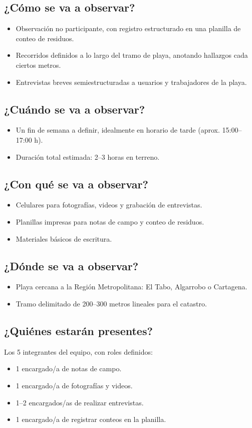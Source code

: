 \documentclass[12pt, letterpaper]{article}
\begin{document}
\subsection*{¿Cómo se va a observar?}
\begin{itemize}
	\item Observación no participante, con registro estructurado
	      en una planilla de conteo de residuos.
	\item Recorridos definidos a lo largo del tramo de playa,
	      anotando hallazgos cada ciertos metros.
	\item Entrevistas breves semiestructuradas a usuarios y
	      trabajadores de la playa.
\end{itemize}

\subsection*{¿Cuándo se va a observar?}
\begin{itemize}
	\item Un fin de semana a definir, idealmente en horario de tarde
	      (aprox. 15:00--17:00 h).
	\item Duración total estimada: 2--3 horas en terreno.
\end{itemize}

\subsection*{¿Con qué se va a observar?}
\begin{itemize}
	\item Celulares para fotografías, videos y grabación de entrevistas.
	\item Planillas impresas para notas de campo y conteo de residuos.
	\item Materiales básicos de escritura.
\end{itemize}

\subsection*{¿Dónde se va a observar?}
\begin{itemize}
	\item Playa cercana a la Región Metropolitana: El Tabo,
	      Algarrobo o Cartagena.
	\item Tramo delimitado de 200--300 metros lineales para el catastro.
\end{itemize}

\subsection*{¿Quiénes estarán presentes?}
Los 5 integrantes del equipo, con roles definidos:
\begin{itemize}
	\item 1 encargado/a de notas de campo.
	\item 1 encargado/a de fotografías y videos.
	\item 1--2 encargados/as de realizar entrevistas.
	\item 1 encargado/a de registrar conteos en la planilla.
\end{itemize}
\end{document}
